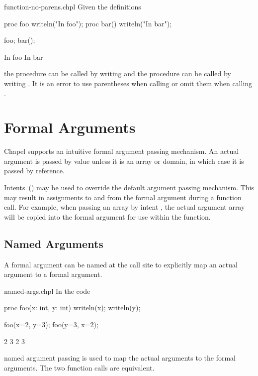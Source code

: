 \begin{chapelexample}{function-no-parens.chpl}
Given the definitions
\begin{chapel}
proc foo { writeln("In foo"); }
proc bar() { writeln("In bar"); }
\end{chapel}
\begin{chapelpost}
foo;
bar();
\end{chapelpost}
\begin{chapeloutput}
In foo
In bar
\end{chapeloutput}
the procedure  can be called by writing  and the
procedure  can be called by writing .  It is an
error to use parentheses when calling  or omit them
when calling .
\end{chapelexample}


\section{Formal Arguments}
\label{Formal_Arguments}

Chapel supports an intuitive formal argument passing mechanism.  An
actual argument is passed by value unless it is an array or domain, in
which case it is passed by reference.

Intents~() may be used to override the default
argument passing mechanism.  This may result in assignments to and from
the formal argument during a function call.  For example, when passing an array by
intent , the actual argument array will be copied into the formal argument
for use within the function.

\subsection{Named Arguments}
\label{Named_Arguments}

A formal argument can be named at the call site to explicitly map an
actual argument to a formal argument.

\begin{chapelexample}{named-args.chpl}
In the code
\begin{chapel}
proc foo(x: int, y: int) { writeln(x); writeln(y); }

foo(x=2, y=3);
foo(y=3, x=2);
\end{chapel}
\begin{chapeloutput}
2
3
2
3
\end{chapeloutput}
named argument passing is used to map the actual arguments to the
formal arguments.  The two function calls are equivalent.
\end{chapelexample}


